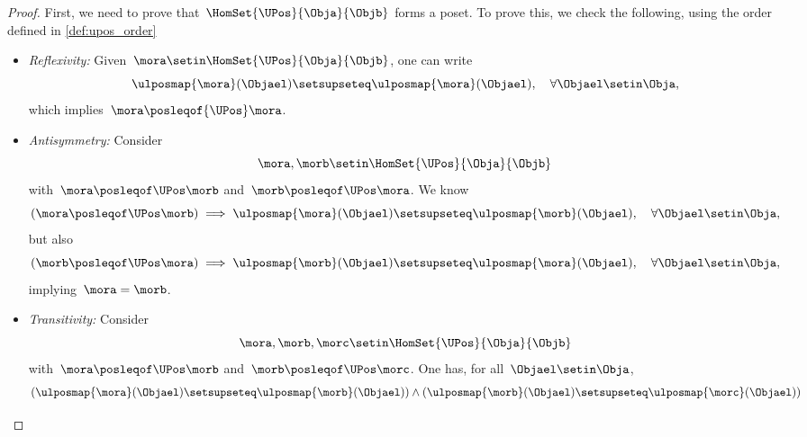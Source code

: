 \begin{proof}
    First, we need to prove that~$\HomSet{\UPos}{\Obja}{\Objb}$ forms a poset.
    To prove this, we check the following, using the order defined in \cref{def:upos_order}
    \begin{itemize}
        \item \emph{Reflexivity:} Given~$\mora \setin \HomSet{\UPos}{\Obja}{\Objb}$, one can write
              \begin{equation*}
                  \ulposmap{\mora}(\Objael) \setsupseteq \ulposmap{\mora}(\Objael), \quad \forall \Objael \setin \Obja,
              \end{equation*}
              which implies~$\mora \posleqof{\UPos} \mora$.
        \item \emph{Antisymmetry:}
              Consider
              \begin{equation}
                  \mora,\morb \setin \HomSet{\UPos}{\Obja}{\Objb}
              \end{equation} with~$\mora \posleqof\UPos \morb$ and~$\morb \posleqof\UPos \mora$.
              We know
              \begin{equation*}
                  (\mora \posleqof\UPos \morb)
                  \implies \ulposmap{\mora}(\Objael) \setsupseteq \ulposmap{\morb}(\Objael), \quad \forall \Objael \setin \Obja,
              \end{equation*}
              but also
              \begin{equation*}
                  (\morb \posleqof\UPos \mora)
                  \implies \ulposmap{\morb}(\Objael) \setsupseteq \ulposmap{\mora}(\Objael), \quad \forall \Objael \setin \Obja,
              \end{equation*}
              implying~$\mora=\morb$.
        \item \emph{Transitivity:}
              Consider
              \begin{equation}
                  \mora,\morb,\morc \setin \HomSet{\UPos}{\Obja}{\Objb}
              \end{equation}
              with~$\mora \posleqof\UPos \morb$ and~$\morb \posleqof\UPos \morc$.
              One has, for all~$\Objael\setin \Obja$,
              \begin{equation*}
                  \begin{aligned}
                      (\ulposmap{\mora}(\Objael) \setsupseteq \ulposmap{\morb}(\Objael))
                      \wedge ( \ulposmap{\morb}(\Objael) \setsupseteq \ulposmap{\morc}(\Objael))

\end{aligned}
\end{equation*}
\end{itemize}
\end{proof}
